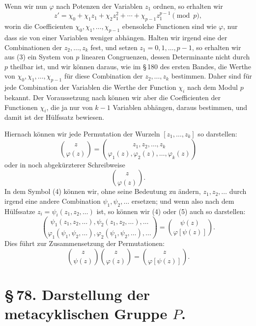 \documentclass[11pt]{article}
\begin{document}
Wenn wir nun $\varphi$ nach Potenzen der Variablen $z_1$ ordnen, so erhalten wir
\begin{equation}
 z'=\chi_0+\chi_1z_1+\chi_2z_1^2+\cdots+\chi_{p-1}z_1^{p-1}\pmod p,
 \tag{3}
\end{equation}
worin die Coefficienten $\chi_0,\chi_1,\ldots,\chi_{p-1}$ ebensolche Functionen sind wie $\varphi$, nur dass sie von einer Variablen weniger abhängen. Halten wir irgend eine der Combinationen der $z_2,\ldots,z_k$ fest, und setzen $z_1=0,1,\ldots,p-1$, so erhalten wir aus (3) ein System von $p$ linearen Congruenzen, dessen Determinante nicht durch $p$ theilbar ist, und wir können daraus, wie im \S\,180 des ersten Bandes, die Werthe von $\chi_0,\chi_1,\ldots,\chi_{p-1}$ für diese Combination der $z_2,\ldots,z_k$ bestimmen. Daher sind für jede Combination der Variablen die Werthe der Function $\chi_i$ nach dem Modul $p$ bekannt. Der Voraussetzung nach können wir aber die Coefficienten der Functionen $\chi_i$, die ja nur von $k-1$ Variablen abhängen, daraus bestimmen, und damit ist der Hülfssatz bewiesen.

Hiernach können wir jede Permutation der Wurzeln $[z_1,\ldots,z_k]$ so darstellen:
\begin{equation}
 \binom{z}{\varphi(z)}
 =
 \binom{z_1,z_2,\ldots,z_k}{\varphi_1(z),\varphi_2(z),\ldots,\varphi_k(z)}
 \tag{4}
\end{equation}
oder in noch abgekürzterer Schreibweise
\begin{equation}
 \binom{z}{\varphi(z)} .
 \tag{5}
\end{equation}
In dem Symbol (4) können wir, ohne seine Bedeutung zu ändern, $z_1,z_2,\ldots$ durch irgend eine andere Combination $\psi_1,\psi_2,\ldots$ ersetzen; und wenn also nach dem Hülfssatze $z_i=\psi_i(z_1,z_2,\ldots)$ ist, so können wir (4) oder (5) auch so darstellen:
\begin{equation}
 \binom{\psi_1(z_1,z_2,\ldots),\psi_2(z_1,z_2,\ldots),\ldots}
       {\varphi_1(\psi_1,\psi_2,\ldots),\varphi_2(\psi_1,\psi_2,\ldots),\ldots}
 =
 \binom{\psi(z)}{\varphi[\psi(z)]}.
 \tag{6}
\end{equation}
Dies führt zur Zusammensetzung der Permutationen:
\begin{equation}
 \binom{z}{\psi(z)}\binom{z}{\varphi(z)}
 =
 \binom{z}{\varphi[\psi(z)]}.
 \tag{7}
\end{equation}

\section*{\S\,78. Darstellung der metacyklischen Gruppe $P$.}
\end{document}
